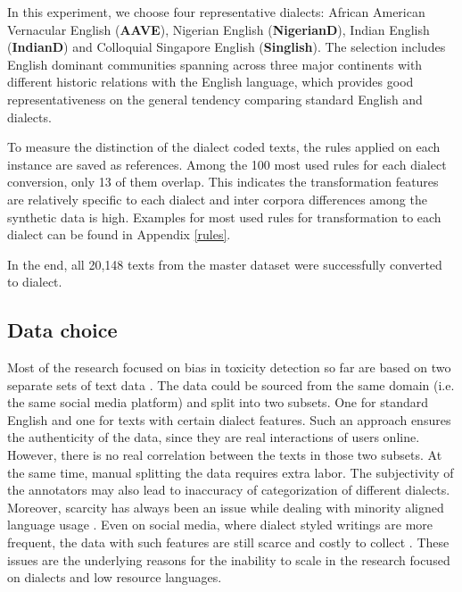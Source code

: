 \documentclass[11pt]{article}
\begin{document}
In this experiment, we choose four representative dialects: African American Vernacular English (\textbf{AAVE}), Nigerian English (\textbf{NigerianD}), Indian English (\textbf{IndianD}) and Colloquial Singapore English (\textbf{Singlish}). The selection includes English dominant communities spanning across three major continents with different historic relations with the English language, which provides good representativeness on the general tendency comparing standard English and dialects.

To measure the distinction of the dialect coded texts, the rules applied on each instance are saved as references. Among the 100 most used rules for each dialect conversion, only 13 of them overlap. This indicates the transformation features are relatively specific to each dialect and inter corpora differences among the synthetic data is high. Examples for most used rules for transformation to each dialect can be found in Appendix \ref{rules}.

In the end, all 20,148 texts from the master dataset were successfully converted to dialect.

\subsection{Data choice}

Most of the research focused on bias in toxicity detection so far are based on two separate sets of text data \citep{sap-etal-2019-risk, davidson-etal-2019-racial, ball-2021-differential, zhou-etal-2021-challenges}. The data could be sourced from the same domain (i.e. the same social media platform) and split into two subsets. One for standard English and one for texts with certain dialect features. Such an approach ensures the authenticity of the data, since they are real interactions of users online. However, there is no real correlation between the texts in those two subsets. At the same time, manual splitting the data requires extra labor. The subjectivity of the annotators may also lead to inaccuracy of categorization of different dialects. Moreover, scarcity has always been an issue while dealing with minority aligned language usage \citep{dash-2019-scarcity}. Even on social media, where dialect styled writings are more frequent, the data with such features are still scarce and costly to collect \citep{jorgensen-2015-challenges}. These issues are the underlying reasons for the inability to scale in the research focused on dialects and low resource languages.
\end{document}
